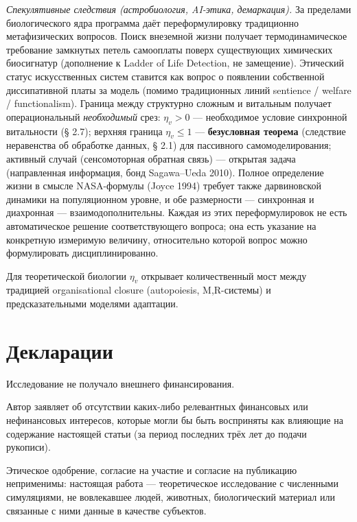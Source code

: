 \documentclass[pdflatex,sn-mathphys-ay]{sn-jnl}
\begin{document}
\emph{Спекулятивные следствия (астробиология, AI-этика, демаркация).} За пределами биологического ядра программа даёт переформулировку традиционно метафизических вопросов. Поиск внеземной жизни получает термодинамическое требование замкнутых петель самооплаты поверх существующих химических биосигнатур (дополнение к Ladder of Life Detection, не замещение). Этический статус искусственных систем ставится как вопрос о появлении собственной диссипативной платы за модель (помимо традиционных линий sentience / welfare / functionalism). Граница между структурно сложным и витальным получает операциональный \emph{необходимый} срез: \(\eta_v > 0\) --- необходимое условие синхронной витальности (§ 2.7); верхняя граница \(\eta_v \le 1\) --- \textbf{безусловная теорема} (следствие неравенства об обработке данных, § 2.1) для пассивного самомоделирования; активный случай (сенсомоторная обратная связь) --- открытая задача (направленная информация, бонд Sagawa--Ueda 2010). Полное определение жизни в смысле NASA-формулы (Joyce 1994) требует также дарвиновской динамики на популяционном уровне, и обе размерности --- синхронная и диахронная --- взаимодополнительны. Каждая из этих переформулировок не есть автоматическое решение соответствующего вопроса; она есть указание на конкретную измеримую величину, относительно которой вопрос можно формулировать дисциплинированно.

Для теоретической биологии \(\eta_v\) открывает количественный мост между традицией organisational closure (autopoiesis, M,R-системы) и предсказательными моделями адаптации.


\backmatter

\section*{Декларации}

Исследование не получало внешнего финансирования.

Автор заявляет об отсутствии каких-либо релевантных финансовых или нефинансовых интересов, которые могли бы быть восприняты как влияющие на содержание настоящей статьи (за период последних трёх лет до подачи рукописи).

Этическое одобрение, согласие на участие и согласие на публикацию неприменимы: настоящая работа --- теоретическое исследование с численными симуляциями, не вовлекавшее людей, животных, биологический материал или связанные с ними данные в качестве субъектов.
\end{document}
